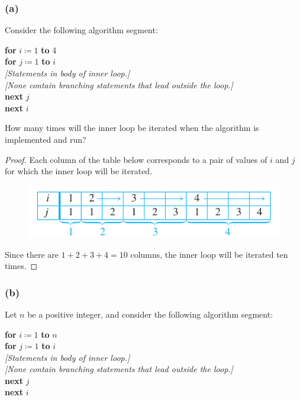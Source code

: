\documentclass[14pt]{extarticle}
\begin{document}
\subsubsection{(a)}
Consider the following algorithm segment:

\begin{tabbing}
{\bf for} \= \(i \coloneqq 1\) {\bf to} 4 \\
          \> {\bf for} \= \(j \coloneqq 1\) {\bf to} $i$ \\
          \>           \> {\it [Statements in body of inner loop.]} \\
          \>           \> {\it [None contain branching statements that lead outside the loop.]} \\
          \> {\bf next} $j$ \\
{\bf next} $i$
\end{tabbing}

How many times will the inner loop be iterated when the algorithm is implemented and run?

\begin{proof}
Each column of the table below corresponds to a pair of values of $i$ and $j$ for which the inner loop will be 
iterated.

\begin{figure}[ht!]
\centering
\includegraphics[scale=0.6]{../images/9.3.9.a.png}
\end{figure}

Since there are \(1 + 2 + 3 + 4 = 10\) columns, the inner loop will be iterated ten times.
\end{proof}

\subsubsection{(b)}
Let $n$ be a positive integer, and consider the following algorithm segment:

\begin{tabbing}
{\bf for} \= \(i \coloneqq 1\) {\bf to} $n$ \\
          \> {\bf for} \= \(j \coloneqq 1\) {\bf to} $i$ \\
          \>           \> {\it [Statements in body of inner loop.]} \\
          \>           \> {\it [None contain branching statements that lead outside the loop.]} \\
          \> {\bf next} $j$ \\
{\bf next} $i$
\end{tabbing}
\end{document}
